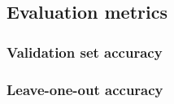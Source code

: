\subsection{Evaluation metrics}

\subsubsection{Validation set accuracy}

\subsubsection{Leave-one-out accuracy}
